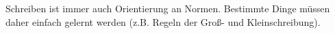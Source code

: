 Schreiben ist immer auch Orientierung an Normen.
Bestimmte Dinge müssen daher einfach gelernt werden (z.B. Regeln der Groß- und Kleinschreibung).